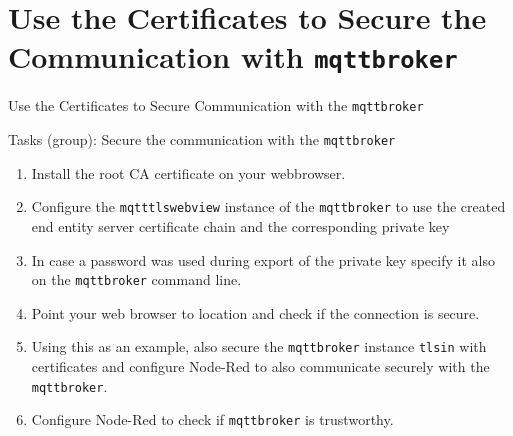 \nosectionpage
\section{Use the Certificates to Secure the Communication with \texttt{mqttbroker}}
\withsectionpage

\begin{frame}{Use the Certificates to Secure Communication with the \texttt{mqttbroker}}
\begin{exampleblock}{Tasks (group): Secure the communication with the \texttt{mqttbroker}}
  \begin{enumerate}
    \item Install the \alert{root CA certificate} on your \alert{webbrowser}.
    \item Configure the \alert{\texttt{mqtttlswebview}} instance of the \alert{\texttt{mqttbroker}} to use the created end entity \alert{server certificate chain} and the corresponding \alert{private key}
    \item In case a \alert{password} was used during export of the \alert{private key} specify it also on the \texttt{mqttbroker} command line.
    \item Point your \alert{web browser} to location \href{https://edge.iot/clients/}{} and \alert{check} if the connection is \alert{secure}.
    \item Using this as an example, \alert{also} secure the \texttt{mqttbroker} instance \alert{\texttt{tlsin}} with \alert{certificates} and configure \alert{Node-Red} to also communicate \alert{securely} with the \texttt{mqttbroker}.
    \item Configure \alert{Node-Red} to \alert{check} if \alert{\texttt{mqttbroker}} is \alert{trustworthy}.
  \end{enumerate}
  \end{exampleblock}
\end{frame}
